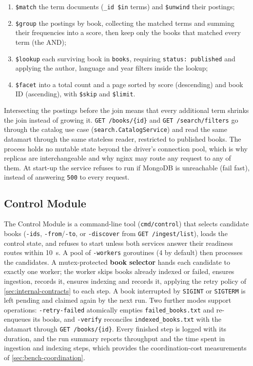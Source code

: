 \documentclass[10pt,a4paper]{article}
\newcommand{\code}[1]{\texttt{#1}}
\newcommand{\route}[1]{\texttt{#1}}
\begin{document}
\begin{enumerate}
  \item \code{\$match} the term documents (\code{\_id \$in} terms) and
  \code{\$unwind} their postings;
  \item \code{\$group} the postings by book, collecting the matched terms and
  summing their frequencies into a score, then keep only the books that
  matched every term (the AND);
  \item \code{\$lookup} each surviving book in \code{books}, requiring
  \code{status: published} and applying the author, language and year filters
  inside the lookup;
  \item \code{\$facet} into a total count and a page sorted by score
  (descending) and book ID (ascending), with \code{\$skip} and \code{\$limit}.
\end{enumerate}

Intersecting the postings before the join means that every additional term
shrinks the join instead of growing it. \route{GET /books/\{id\}} and
\route{GET /search/filters} go through the catalog use case
(\code{search.CatalogService}) and read the same datamart through the same
stateless reader, restricted to published books. The process holds no mutable state
beyond the driver's connection pool, which is why replicas are interchangeable
and why nginx may route any request to any of them. At start-up the service
refuses to run if MongoDB is unreachable (fail fast), instead of answering
\code{500} to every request.

\subsection{Control Module}
\label{sec:impl-control}

The Control Module is a command-line tool (\code{cmd/control}) that selects
candidate books (\code{-ids}, \code{-from}/\code{-to}, or \code{-discover}
from \route{GET /ingest/list}), loads the control state, and refuses to start
unless both services answer their readiness routes within 10~s. A pool of
\code{-workers} goroutines (4 by default) then processes the candidates. A
mutex-protected \textbf{book selector} hands each candidate to exactly one
worker; the worker skips books already indexed or failed, ensures ingestion,
records it, ensures indexing and records it, applying the retry policy of
\cref{sec:internal-contracts} to each step. A book interrupted by
\code{SIGINT} or \code{SIGTERM} is left pending and claimed again by the next
run. Two further modes support operations:
\code{-retry-failed} atomically empties \code{failed\_books.txt} and
re-enqueues its books, and \code{-verify} reconciles \code{indexed\_books.txt}
with the datamart through \route{GET /books/\{id\}}. Every finished step is
logged with its duration, and the run summary reports throughput and the time
spent in ingestion and indexing steps, which provides the coordination-cost
measurements of \cref{sec:bench-coordination}.
\end{document}
